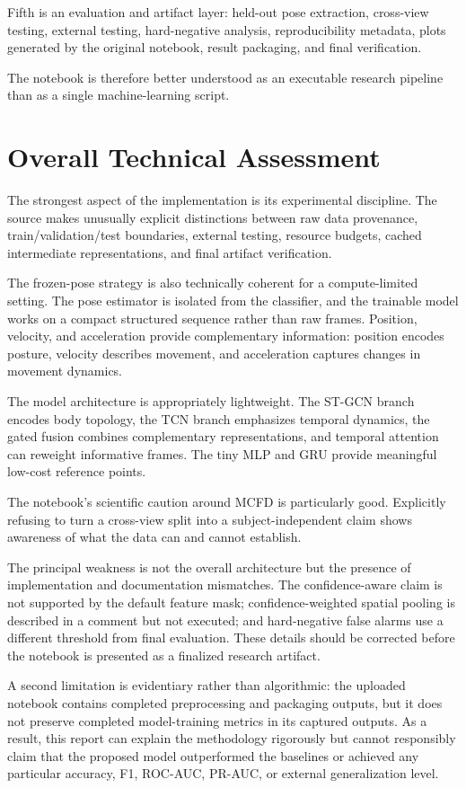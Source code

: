 \documentclass[11pt,a4paper]{article}
\begin{document}
Fifth is an evaluation and artifact layer: held-out pose extraction, cross-view testing, external testing, hard-negative analysis, reproducibility metadata, plots generated by the original notebook, result packaging, and final verification.

The notebook is therefore better understood as an executable research pipeline than as a single machine-learning script.

\section{Overall Technical Assessment}

The strongest aspect of the implementation is its experimental discipline. The source makes unusually explicit distinctions between raw data provenance, train/validation/test boundaries, external testing, resource budgets, cached intermediate representations, and final artifact verification.

The frozen-pose strategy is also technically coherent for a compute-limited setting. The pose estimator is isolated from the classifier, and the trainable model works on a compact structured sequence rather than raw frames. Position, velocity, and acceleration provide complementary information: position encodes posture, velocity describes movement, and acceleration captures changes in movement dynamics.

The model architecture is appropriately lightweight. The ST-GCN branch encodes body topology, the TCN branch emphasizes temporal dynamics, the gated fusion combines complementary representations, and temporal attention can reweight informative frames. The tiny MLP and GRU provide meaningful low-cost reference points.

The notebook's scientific caution around MCFD is particularly good. Explicitly refusing to turn a cross-view split into a subject-independent claim shows awareness of what the data can and cannot establish.

The principal weakness is not the overall architecture but the presence of implementation and documentation mismatches. The confidence-aware claim is not supported by the default feature mask; confidence-weighted spatial pooling is described in a comment but not executed; and hard-negative false alarms use a different threshold from final evaluation. These details should be corrected before the notebook is presented as a finalized research artifact.

A second limitation is evidentiary rather than algorithmic: the uploaded notebook contains completed preprocessing and packaging outputs, but it does not preserve completed model-training metrics in its captured outputs. As a result, this report can explain the methodology rigorously but cannot responsibly claim that the proposed model outperformed the baselines or achieved any particular accuracy, F1, ROC-AUC, PR-AUC, or external generalization level.
\end{document}
